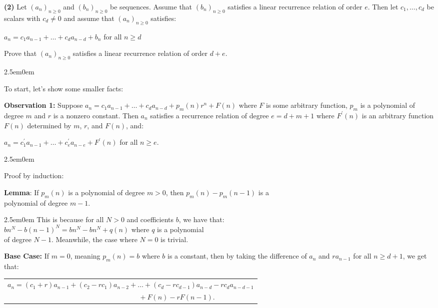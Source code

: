 \documentclass{book}
\newcommand{\exOne}{%
   \color{Purple}%
   \fontsize{13}{15}\selectfont%
}
\newcommand{\exPP}{%
   \color{RedViolet}%
   \fontsize{12}{14}\selectfont%
}
\newenvironment{myIndent}{%
   \begin{adjustwidth}{2.5em}{0em}%
}{%
   \end{adjustwidth}%
}
\newcommand{\blab}[1]{\textbf{#1}}
\newcommand{\retTwo}{\hfill\bigbreak}
\begin{document}
\blab{(2)} Let $(a_n)_{n\geq 0}$ and $(b_n)_{n \geq 0}$ be sequences. Assume that $(b_n)_{n \geq 0}$ satisfies a linear recurrence relation of order $e$. Then let $c_1, \ldots, c_d$ be scalars with $c_d \neq 0$ and assume that $(a_n)_{n \geq 0}$ satisfies:

{\centering $a_n = c_1a_{n-1} + \ldots + c_da_{n-d} + b_n$ for all $n \geq d$\retTwo\par}

Prove that $(a_n)_{n \geq 0}$ satisfies a linear recurrence relation of order $d + e$.

\begin{myIndent}\exOne
   To start, let's show some smaller facts:\retTwo

   \blab{Observation 1:} Suppose $a_n = c_1a_{n-1} + \ldots + c_da_{n-d} + p_m(n)r^n + F(n)$ where $F$ is some arbitrary function, $p_m$ is a polynomial of degree $m$ and $r$ is a nonzero constant. Then $a_n$ satisfies a recurrence relation of degree $e = d + m + 1$ where $F^\prime(n)$ is an arbitrary function $F(n)$ determined by $m$, $r$, and $F(n)$, and:
   
   {\centering $a_n = c^\prime_1 a_{n-1} + \ldots + c^\prime_e a_{n-e} + F^\prime(n)$ for all $n \geq e$.\newpage\par}
   
   \begin{myIndent}\exPP
         Proof by induction:\retTwo

         \blab{Lemma}: If $p_m(n)$ is a polynomial of degree $m > 0$, then $p_m(n) - p_m(n-1)$ is a\\ polynomial of degree $m - 1$.
         
         \begin{myIndent}\color{VioletRed}
            This is because for all $N > 0$ and coefficients $b$, we have that:\\ $bn^N - b(n - 1)^N = bn^N - bn^N + q(n)$ where $q$ is a polynomial\\ of degree $N - 1$. Meanwhile, the case where $N = 0$ is trivial.\retTwo
         \end{myIndent}

         \blab{Base Case:} If $m = 0$, meaning $p_m(n) = b$ where $b$ is a constant, then by taking the difference of $a_n$ and $r a_{n-1}$ for all $n \geq d + 1$, we get that:

         {\centering 
         \begin{tabular}{l}
            $a_n = (c_1 + r)a_{n-1} + (c_2 - rc_1)a_{n-2} + \ldots + (c_d - rc_{d-1})a_{n-d} - rc_da_{n-d-1}$\\ [4pt] $\phantom{Aaaaaaaaaaaaaaaaaaaaaaaaaaaaaaaaaaa} + F(n) - rF(n-1)$.
         \end{tabular} \retTwo\par}


\end{myIndent}
\end{myIndent}
\end{document}
